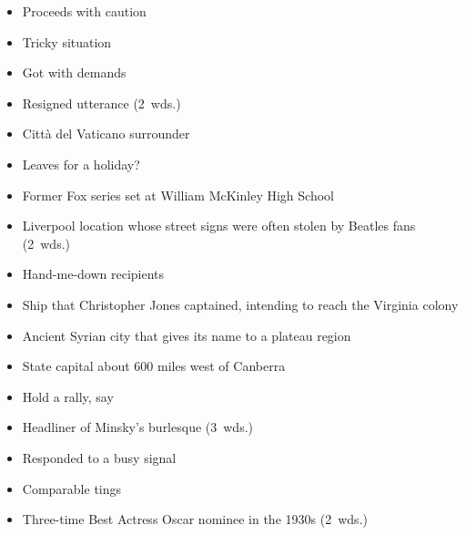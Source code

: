 {\begin{itemize}
      \item
        Proceeds with caution
      \item
        Tricky situation
    \end{itemize}
  \item
    \begin{itemize}
      \item
        Got with demands
      \item
        Resigned utterance (2~wds.)
    \end{itemize}
  \item
    \begin{itemize}
      \item
        Citt\`{a} del Vaticano surrounder
      \item
        Leaves for a holiday?
    \end{itemize}
  \item
    \begin{itemize}
      \item
        Former Fox series set at William McKinley High School
      \item
        Liverpool location whose street signs were often stolen by Beatles fans (2~wds.)
    \end{itemize}
  \item
    \begin{itemize}
      \item
        Hand-me-down recipients
      \item
        Ship that Christopher Jones captained, intending to reach the Virginia colony
    \end{itemize}
  \item
    \begin{itemize}
      \item
        Ancient Syrian city that gives its name to a plateau region
      \item
        State capital about 600 miles west of Canberra
    \end{itemize}
}{%
  \item
    \begin{itemize}
      \item
        Hold a rally, say
      \item
        Headliner of Minsky's burlesque (3~wds.)
      \item
        Responded to a busy signal
      \item
        Comparable tings
      \item
        Three-time Best Actress Oscar nominee in the 1930s (2~wds.)

\end{itemize}}
